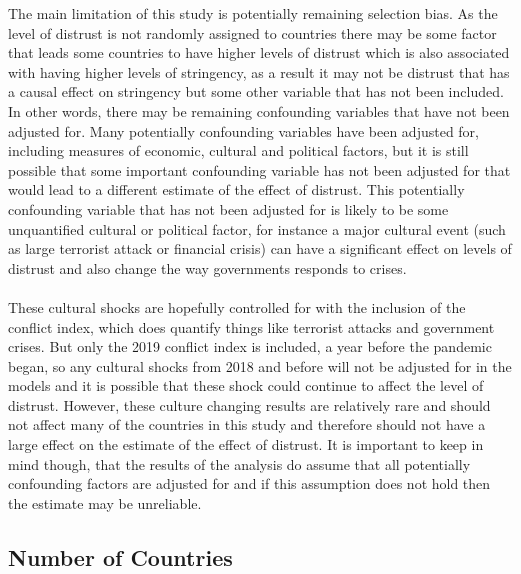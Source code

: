 \documentclass[
  11pt,
]{article}
\begin{document}
The main limitation of this study is potentially remaining selection bias. As the level of distrust is not randomly assigned to countries there may be some factor that leads some countries to have higher levels of distrust which is also associated with having higher levels of stringency, as a result it may not be distrust that has a causal effect on stringency but some other variable that has not been included. In other words, there may be remaining confounding variables that have not been adjusted for. Many potentially confounding variables have been adjusted for, including measures of economic, cultural and political factors, but it is still possible that some important confounding variable has not been adjusted for that would lead to a different estimate of the effect of distrust. This potentially confounding variable that has not been adjusted for is likely to be some unquantified cultural or political factor, for instance a major cultural event (such as large terrorist attack or financial crisis) can have a significant effect on levels of distrust and also change the way governments responds to crises.\\
~\\
These cultural shocks are hopefully controlled for with the inclusion of the conflict index, which does quantify things like terrorist attacks and government crises. But only the 2019 conflict index is included, a year before the pandemic began, so any cultural shocks from 2018 and before will not be adjusted for in the models and it is possible that these shock could continue to affect the level of distrust. However, these culture changing results are relatively rare and should not affect many of the countries in this study and therefore should not have a large effect on the estimate of the effect of distrust. It is important to keep in mind though, that the results of the analysis do assume that all potentially confounding factors are adjusted for and if this assumption does not hold then the estimate may be unreliable.\\

\hypertarget{number-of-countries}{%
\subsection{Number of Countries}\label{number-of-countries}}
\end{document}
